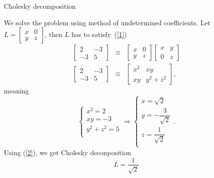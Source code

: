 \begin{problem}{Cholesky decomposition}
\begin{solution}
    We solve the problem using method of undetermined coefficients. Let 
    $L= \begin{bmatrix}
            x & 0 \\
            y & z
        \end{bmatrix}$, then $L$ has to satisfy~(\ref{1})
        \begin{eqnarray}
            \begin{bmatrix}
                2 & -3 \\
                -3 & 5
            \end{bmatrix}
            &\equiv&
            \begin{bmatrix}
                x & 0 \\
                y & z
            \end{bmatrix}
            \begin{bmatrix}
                x & y \\
                0 & z
            \end{bmatrix}\nonumber\\
            \begin{bmatrix}
                2 & -3 \\
                -3 & 5
            \end{bmatrix}
            &\equiv&
            \begin{bmatrix}
                x^2 & xy \\
                xy & y^2+z^2
            \end{bmatrix},\nonumber
        \end{eqnarray}
        meaning 
        \begin{equation}
            \begin{cases}
                x^2=2\\
                xy=-3\\
                y^2+z^2=5\\
            \end{cases}
            \Rightarrow
            \begin{cases}
                x=\sqrt{2}\\
                y=-\dfrac{3}{\sqrt{2}}\\
                z=\dfrac{1}{\sqrt{2}}\\
            \end{cases}.\label{2}
        \end{equation}
        Using (\ref{2}), we get Cholesky deconposition 
        $$
            L=\dfrac{1}{\sqrt{2}}
$$
\end{solution}
\end{problem}
